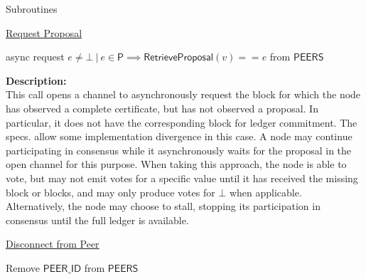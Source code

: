\documentclass[10pt,a4paper]{article}
\begin{document}
\begin{section}{Subroutines}

\begin{algorithm}[H]
    \caption{\underline{Request Proposal}}
    \label{algo:request-proposal}
    \begin{algorithmic}[1]
        \State async request $e \neq \bot \ | \ e \in \mathsf{P} \implies \mathsf{RetrieveProposal}(v) == e$ from $\mathsf{PEERS}$ 
    \EndFunction
    \end{algorithmic}
\end{algorithm}


\noindent \textbf{Description:} \\
This call opens a channel to asynchronously request the block for which the node has
observed a complete certificate, but has not observed a proposal. In particular, it does not
have the corresponding block for ledger commitment.
The specs. allow some implementation divergence in this case.
A node may continue participating in consensus while it asynchronously waits for the proposal
in the open channel for this purpose. When taking this approach, the node is able to vote, but may
not emit votes for a specific value until it has received the missing block or blocks, and may only produce
votes for $\bot$ when applicable.
Alternatively, the node may choose to stall, stopping its participation in consensus until the full ledger is available.




\begin{algorithm}[H]
    \caption{\underline{Disconnect from Peer}}
    \label{algo:disconnect-peer}
    \begin{algorithmic}[1]
        \State Remove $\mathsf{PEER\_ID}$ from $\mathsf{PEERS}$
    \EndFunction
    \end{algorithmic}
\end{algorithm}


\end{section}
\end{document}
